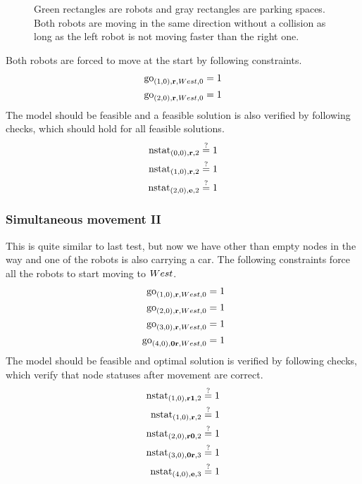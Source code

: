 \begin{figure}[h]
    \begin{center}
        
        \caption{Green rectangles are robots and gray rectangles are parking
            spaces. Both robots are moving in the same direction without a
            collision as long as the left robot is not moving faster than the right
        one.}
        \label{fig:simumove}
    \end{center}
\end{figure}

Both robots are forced to move at the start by following constraints.
\begin{align}
    \mathrm{go}_{(1,0),\text{\bf r},West,0} &= 1\\
    \mathrm{go}_{(2,0),\text{\bf r},West,0} &= 1
\end{align}
The model should be feasible and a feasible solution is also verified by following
checks, which should hold for all feasible solutions.
\begin{align}
    \mathrm{nstat}_{(0,0), \text{\bf r}, 2} &\overset{?}{=} 1\\
    \mathrm{nstat}_{(1,0), \text{\bf r}, 2} &\overset{?}{=} 1\\
    \mathrm{nstat}_{(2,0), \text{\bf e}, 2} &\overset{?}{=} 1
\end{align}

\subsubsection{Simultaneous movement II}
This is quite similar to last test, but now we have other than empty nodes in
the way and one of the robots is also carrying a car. The following constraints
force all the robots to start moving to $West$.
\begin{align}
    \mathrm{go}_{(1,0),\text{\bf r},West,0} &= 1\\
    \mathrm{go}_{(2,0),\text{\bf r},West,0} &= 1\\
    \mathrm{go}_{(3,0),\text{\bf r},West,0} &= 1\\
    \mathrm{go}_{(4,0),\text{\bf 0r},West,0} &= 1
\end{align}
The model should be feasible and optimal solution is verified by following
checks, which verify that node statuses after movement are correct.
\begin{align}
    \mathrm{nstat}_{(1,0), \text{\bf r1}, 2} &\overset{?}{=} 1\\
    \mathrm{nstat}_{(1,0), \text{\bf r}, 2} &\overset{?}{=} 1\\
    \mathrm{nstat}_{(2,0), \text{\bf r0}, 2} &\overset{?}{=} 1\\
    \mathrm{nstat}_{(3,0), \text{\bf 0r}, 3} &\overset{?}{=} 1\\
    \mathrm{nstat}_{(4,0), \text{\bf e}, 3} &\overset{?}{=} 1
\end{align}

